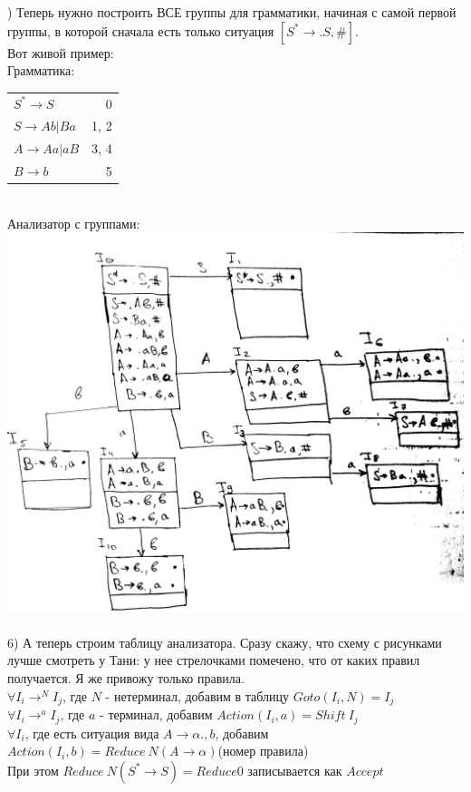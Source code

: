 \documentclass[14pt]{extreport}
\begin{document}
	) Теперь нужно построить ВСЕ группы для грамматики, начиная с самой первой группы, в
	которой сначала есть только ситуация $[S^* \to .S,\#]$.\\
	Вот живой пример:\\
	Грамматика:\\
	\begin{tabular}{lr}
		$S^* \to S$ & 0\\
		$S \to Ab|Ba$ & 1, 2\\
		$A \to Aa | aB$ & 3, 4\\
		$B \to b$ & 5\\
	\end{tabular}\\
	Анализатор с группами:\\
	\includegraphics[scale=0.14]{data/pic8_1.png}\\\\
	6) А теперь строим таблицу анализатора. Сразу скажу, что схему с рисунками лучше
	смотреть у Тани: у нее стрелочками помечено, что от каких правил получается.
	Я же привожу только правила.\\
	$\forall I_i \to^{N} I_j$, где $N$ - нетерминал, добавим в таблицу $Goto(I_i,N)=I_j$\\
	$\forall I_i \to^a I_j$, где $a$ - терминал, добавим $Action(I_i, a)=Shift\ I_j$\\
	$\forall I_i$, где есть ситуация вида $A \to \alpha ., b$, добавим 
	$Action(I_i, b) = Reduce\ N(A \to \alpha)$(номер правила)\\
	При этом $Reduce\ N(S^* \to S) = Reduce 0$ записывается как $Accept$\\
\end{document}
